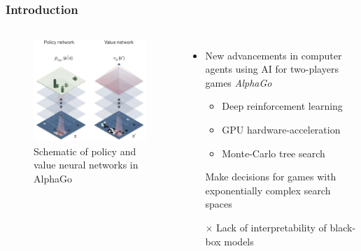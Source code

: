 \documentclass{beamer}
\begin{document}
\subsection{}
\begin{framefont}{\footnotesize}
  \begin{frame}
    \frametitle{Introduction}
    \begin{columns}
      \begin{figure}
        \centering
        \includegraphics[trim={0.2cm -2cm 0.05cm 0.1cm},clip,width=5.3cm]{alpha_go.png}
        \caption{Schematic of policy and value neural networks in AlphaGo }
      \end{figure}
      \begin{itemize}[<+->]
        \setlength\itemsep{1.2em}
        \item New advancements in computer agents using AI for two-players games \textit{AlphaGo} 
        \begin{itemize}
          \item Deep reinforcement learning
          \item GPU hardware-acceleration 
          \item Monte-Carlo tree search
        \end{itemize}
        \item[\checkmark] Make decisions for games with exponentially complex search spaces
        \item[$\bm{\times}$] Lack of interpretability of black-box models 

      \end{itemize}
    \end{columns}
  \end{frame}
\end{framefont}
\end{document}

